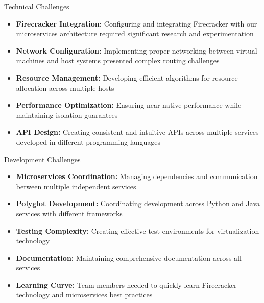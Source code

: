 \documentclass{beamer}
\begin{document}
\begin{frame}{Technical Challenges}
  \begin{itemize}
    \item \textbf{Firecracker Integration:} Configuring and integrating Firecracker with our microservices architecture required significant research and experimentation
    \item \textbf{Network Configuration:} Implementing proper networking between virtual machines and host systems presented complex routing challenges
    \item \textbf{Resource Management:} Developing efficient algorithms for resource allocation across multiple hosts
    \item \textbf{Performance Optimization:} Ensuring near-native performance while maintaining isolation guarantees
    \item \textbf{API Design:} Creating consistent and intuitive APIs across multiple services developed in different programming languages
  \end{itemize}
\end{frame}

\begin{frame}{Development Challenges}
  \begin{itemize}
    \item \textbf{Microservices Coordination:} Managing dependencies and communication between multiple independent services
    \item \textbf{Polyglot Development:} Coordinating development across Python and Java services with different frameworks
    \item \textbf{Testing Complexity:} Creating effective test environments for virtualization technology
    \item \textbf{Documentation:} Maintaining comprehensive documentation across all services
    \item \textbf{Learning Curve:} Team members needed to quickly learn Firecracker technology and microservices best practices
  \end{itemize}
\end{frame}
\end{document}
